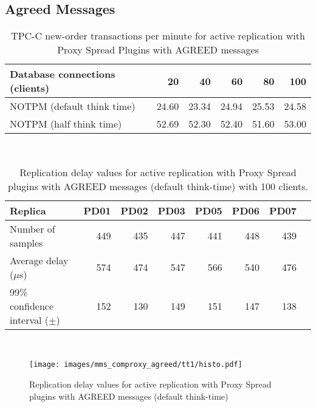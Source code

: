 \clearpage
\subsection{Agreed Messages}

\begin{table}[h!]
\centering    
\begin{tabular}{lrrrrr}
 \hline\hline
Database connections (clients) & 20 & 40 & 60 & 80 & 100 \\
\hline
NOTPM (default think time) & 24.60 & 23.34 & 24.94 & 25.53 & 24.58 \\
NOTPM (half think time) & 52.69 & 52.30 & 52.40 & 51.60 & 53.00 \\
\hline
\end{tabular}

~\\
\caption{TPC-C new-order transactions per minute for active replication with Proxy Spread Plugins with AGREED messages}
\label{tab:table_tpcc4}
\end{table}

\begin{table}[h!]
\centering    
\begin{tabular}{lrrrrrrr}
 \hline\hline
 Replica & PD01 & PD02 & PD03 & PD05 & PD06 & PD07 \\
\hline
Number of samples & 449 & 435 & 447 & 441 & 448 & 439 \\
Average delay ($\mu$s) & 574 & 474 & 547 & 566 & 540 & 476 \\
99\% confidence interval ($\pm$) & 152 & 130 & 149 & 151 & 147 & 138 \\
\hline
\end{tabular}

~\\
\caption{Replication delay values for active replication with Proxy Spread plugins with AGREED messages (default think-time) with 100 clients.}
\label{tab:table4}
\end{table}



\begin{figure}[h!]
\centering    
\texttt{[image: images/mms\_comproxy\_agreed/tt1/histo.pdf]}
\caption{Replication delay values for active replication with Proxy Spread plugins with AGREED messages (default think-time)}
\label{fig:mms_comproxy_agreed_tt1}
\end{figure}

